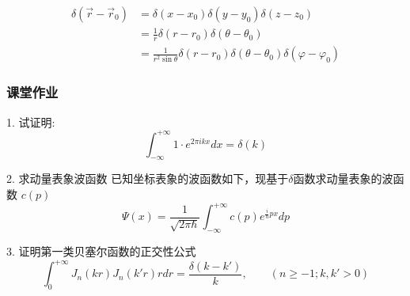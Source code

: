 \begin{frame}
	\frametitle{}
	 \[
		\begin{aligned}
		  \delta (\vec{r}-\vec{r}_0) &=  \delta (x-x_0) \delta (y-y_0) \delta (z-z_0)\\
		  &=  \frac{1}{r}\delta (r-r_0) \delta (\theta -\theta_0) \\
		  &=  \frac{1}{r^2\sin\theta}\delta (r-r_0) \delta (\theta -\theta_0) \delta (\varphi -\varphi_0)
		\end{aligned}
		   \]
\end{frame}

\begin{frame}
	\frametitle{课堂作业}
	 \begin{exampleblock}{1. 试证明:}
	 \[
	\int_{-\infty}^{+\infty} 1 \cdot e^{2\pi i kx} d x = \delta(k)
	\]
	 \end{exampleblock}
	\begin{exampleblock} {2. 求动量表象波函数}
	{已知坐标表象的波函数如下，现基于$\delta$函数求动量表象的波函数 $c(p)$}
		\begin{equation*}
			\Psi(x)=\frac{1}{\sqrt{2\pi \hbar}}  \int_{-\infty}^{+\infty} c(p) e^{\frac{i}{\hbar} px} dp 
		\end{equation*}   	
	\end{exampleblock}
\begin{exampleblock} {3. 证明第一类贝塞尔函数的正交性公式}
	\[\int_{0}^{+\infty} J_n(kr)J_n(k'r) r dr = \frac{\delta(k-k')}{k}, \qquad (n\geq-1; k, k'>0)\] 
	\end{exampleblock}
\end{frame}
